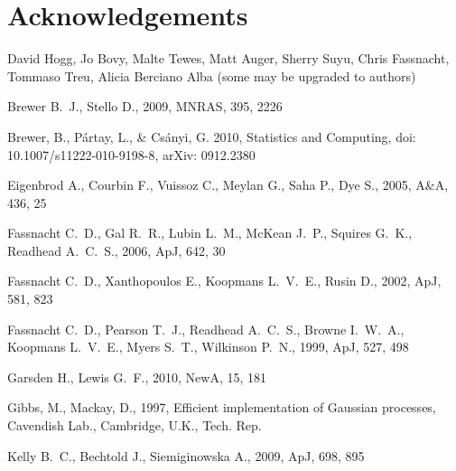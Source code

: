 \documentclass[useAMS,usenatbib, a4paper]{mn2e} \usepackage{natbib}
\begin{document}

\section{Acknowledgements}
David Hogg, Jo Bovy, Malte Tewes, Matt Auger, Sherry Suyu, Chris Fassnacht, Tommaso Treu, Alicia Berciano Alba
(some may be upgraded to authors)


\begin{thebibliography}{99} 
 Brewer B.~J., Stello D., 2009, MNRAS, 395, 2226

Brewer, B., P\'{a}rtay, L., \& Cs\'{a}nyi, G. 2010, Statistics and Computing, doi: 10.1007/s11222-010-9198-8, arXiv: 0912.2380

 Eigenbrod A., Courbin F., Vuissoz C., Meylan G., Saha P., Dye S., 2005, A\&A, 436, 25 

 Fassnacht C.~D., Gal R.~R., Lubin L.~M., 
McKean J.~P., Squires G.~K., Readhead A.~C.~S., 2006, ApJ, 642, 30 

 Fassnacht C.~D., Xanthopoulos E., Koopmans 
L.~V.~E., Rusin D., 2002, ApJ, 581, 823 

 Fassnacht C.~D., Pearson T.~J., Readhead 
A.~C.~S., Browne I.~W.~A., Koopmans L.~V.~E., Myers S.~T., Wilkinson P.~N., 
1999, ApJ, 527, 498 

 Garsden H., Lewis G.~F., 2010, NewA, 15, 181 

Gibbs, M., Mackay, D., 1997, Efficient implementation of Gaussian processes, Cavendish Lab., Cambridge, U.K., Tech. Rep.

 Kelly B.~C., Bechtold J., Siemiginowska A., 2009, ApJ, 698, 895 


\end{thebibliography}
\end{document}

